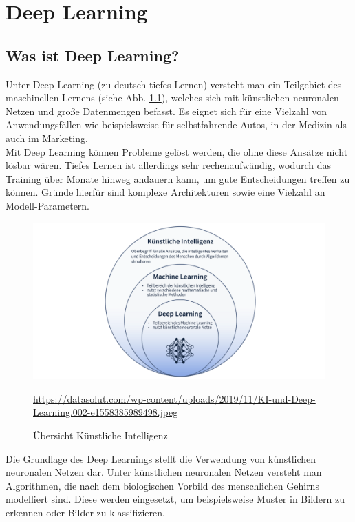 \chapter{Deep Learning}

\section{Was ist Deep Learning?}

Unter Deep Learning (zu deutsch tiefes Lernen) versteht man ein Teilgebiet des maschinellen Lernens (siehe Abb. \ref{overview-ki}), welches sich mit künstlichen neuronalen Netzen und große Datenmengen befasst. Es eignet sich für eine Vielzahl von Anwendungsfällen wie beispielsweise für selbstfahrende Autos, in der Medizin als auch im Marketing. \cite{datasolut2}\\

Mit Deep Learning können Probleme gelöst werden, die ohne diese Ansätze nicht lösbar wären. Tiefes Lernen ist allerdings sehr rechenaufwändig, wodurch das Training über Monate hinweg andauern kann, um gute Entscheidungen treffen zu können. Gründe hierfür sind komplexe Architekturen sowie eine Vielzahl an Modell-Parametern. \cite{datasolut2} \\

\begin{figure}[H]
	\centering
	\includegraphics[width=\textwidth]{kapitel3/images/KI_Uebersicht.png}
	\caption{Übersicht Künstliche Intelligenz}
	\label{overview-ki}
	\vspace{0.2cm}
	\quelle\url{https://datasolut.com/wp-content/uploads/2019/11/KI-und-Deep-Learning.002-e1558385989498.jpeg}
\end{figure}

Die Grundlage des Deep Learnings stellt die Verwendung von künstlichen neuronalen Netzen dar. Unter künstlichen neuronalen Netzen versteht man Algorithmen, die nach dem biologischen Vorbild des menschlichen Gehirns modelliert sind. Diese werden eingesetzt, um beispielsweise Muster in Bildern zu erkennen oder Bilder zu klassifizieren. \cite{datasolut2}\\

